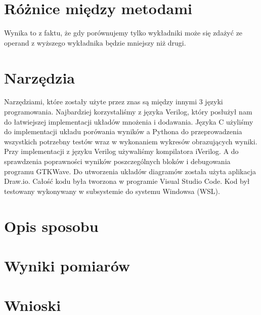 \documentclass{article}
\begin{document}
\section{Różnice między metodami}

Wynika to z faktu, że gdy porównujemy tylko wykładniki może się zdażyć ze operand z wyższego wykładnika będzie mniejszy niż drugi. 

\section{Narzędzia}
Narzędziami, które zostały użyte przez znas są między innymi 3 języki programowania. Najbardziej korzystaliśmy z języka Verilog, który posłużył nam do łatwiejszej implementacji układów mnożenia i dodawania.
Języka C użyliśmy do implementacji układu porówania wyników a Pythona do przeprowadzenia wszystkich potrzebny testów wraz w wykonaniem wykresów obrazujących wyniki.
Przy implementacji z języku Verilog używaliśmy kompilatora iVerilog.
A do sprawdzenia poprawności wyników poszczególnych bloków i debugowania programu GTKWave.
Do utworzenia układów diagramów została użyta aplikacja Draw.io.
Całość kodu była tworzona w programie Visual Studio Code.
Kod był testowany wykonywany w subsystemie do systemu Windowsa (WSL).



\section{Opis sposobu}

\section{Wyniki pomiarów}

\section{Wnioski}


\newpage
{}
{}


\end{document}
